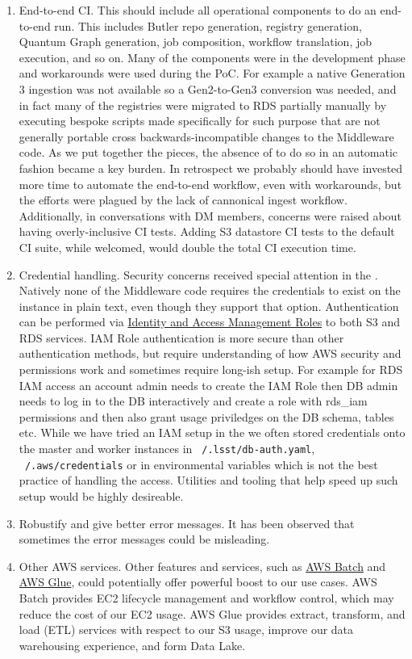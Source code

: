 \begin{enumerate}
\item End-to-end CI.
This should include all operational components to do an end-to-end run.
This includes Butler repo generation, registry generation, Quantum Graph generation, job composition, workflow translation, job execution, and so on.
Many of the components were in the development phase and workarounds were used during the PoC.
For example a native Generation 3 ingestion was not available so a Gen2-to-Gen3 conversion was needed, and in fact many of the registries were migrated to RDS partially manually by executing bespoke scripts made specifically for such purpose that are not generally portable cross backwards-incompatible changes to the Middleware code.
As we put together the pieces, the absence of to do so in an automatic fashion became a key burden.
In retrospect we probably should have invested more time to automate the end-to-end workflow, even with workarounds, but the efforts were plagued by the lack of cannonical ingest workflow. Additionally, in conversations with DM members, concerns were raised about having overly-inclusive CI tests. Adding S3 datastore CI tests to the default CI suite, while welcomed, would double the total CI execution time.
\item Credential handling.
Security concerns received special attention in the \poc. Natively none of the Middleware code requires the credentials to exist on the instance in plain text, even though they support that option. Authentication can be performed via \href{https://docs.aws.amazon.com/IAM/latest/UserGuide/id_roles.html}{Identity and Access Management Roles} to both S3 and RDS services. IAM Role authentication is more secure than other authentication methods, but require understanding of how AWS security and permissions work and sometimes require long-ish setup. For example for RDS IAM access an account admin needs to create the IAM Role then DB admin needs to log in to the DB interactively and create a role with rds\_iam permissions and then also grant usage priviledges on the DB schema, tables etc. While we have tried an IAM setup in the \poc we often stored credentials onto the master and worker instances in \texttt{~/.lsst/db-auth.yaml}, \texttt{~/.aws/credentials} or in environmental variables which is not the best practice of handling the access. Utilities and tooling that help speed up such setup would be highly desireable. 
\item Robustify and give better error messages.
It has been observed that sometimes the error messages could be misleading.
\item Other AWS services.
Other features and services, such as \href{https://aws.amazon.com/batch/}{AWS Batch} and \href{https://aws.amazon.com/glue/}{AWS Glue}, could potentially offer powerful boost to our use cases.
AWS Batch provides EC2 lifecycle management and workflow control, which may reduce the cost of our EC2 usage.
AWS Glue provides extract, transform, and load (ETL) services with respect to our S3 usage, improve our data warehousing experience, and form Data Lake.

\end{enumerate}

